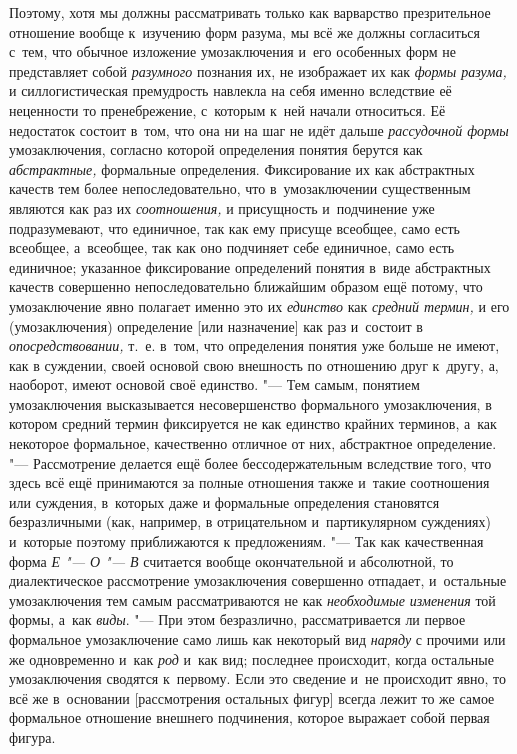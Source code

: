Поэтому, хотя мы должны рассматривать только как варварство
презрительное отношение вообще к~изучению форм разума, мы всё же должны
согласиться с~тем, что обычное изложение умозаключения и~его особенных форм
не представляет собой {\em разумного}
познания их, не изображает их как
{\em формы разума,} и
силлогистическая премудрость навлекла на себя именно вследствие её
неценности то пренебрежение, с~которым к~ней начали относиться. Её
недостаток состоит в~том, что она ни на шаг не идёт дальше
{\em рассудочной формы}
умозаключения, согласно которой определения понятия берутся
как {\em абстрактные,}
формальные определения. Фиксирование их как абстрактных
качеств тем более непоследовательно, что в~умозаключении существенным
являются как раз их {\em соотношения,}
и присущность и~подчинение уже подразумевают, что единичное,
так как ему присуще всеобщее, само есть всеобщее, а~всеобщее, так как оно
подчиняет себе единичное, само есть единичное; указанное фиксирование
определений понятия в~виде абстрактных качеств совершенно непоследовательно
ближайшим образом ещё потому, что умозаключение явно полагает именно это их
{\em единство} как
{\em средний термин,} и
его (умозаключения) определение [или назначение] как раз и~состоит в
{\em опосредствовании,}
т.~е. в~том, что определения понятия уже больше не имеют, как
в суждении, своей основой свою внешность по отношению друг к~другу, а,
наоборот, имеют основой своё единство. "--- Тем самым, понятием
умозаключения высказывается несовершенство формального умозаключения, в
котором средний термин фиксируется не как единство крайних терминов, а~как
некоторое формальное, качественно отличное от них, абстрактное
определение. "--- Рассмотрение делается ещё более
бессодержательным вследствие того, что здесь всё ещё принимаются за полные
отношения также и~такие соотношения или суждения, в~которых даже и
формальные определения становятся безразличными (как, например, в
отрицательном и~партикулярном суждениях) и~которые поэтому приближаются к
предложениям. "--- Так как качественная форма
{\em Е "--- О "--- В} считается вообще окончательной и
абсолютной, то диалектическое рассмотрение умозаключения совершенно
отпадает, и~остальные умозаключения тем самым рассматриваются не как
{\em необходимые изменения}
той формы, а~как
{\em виды}. "--- При этом
безразлично, рассматривается ли первое формальное умозаключение само лишь
как некоторый вид {\em наряду}
с прочими или же одновременно и~как
{\em род} и~как вид;
последнее происходит, когда остальные умозаключения сводятся к~первому.
Если это сведение и~не происходит явно, то всё же в~основании [рассмотрения
остальных фигур] всегда лежит то же самое формальное отношение внешнего
подчинения, которое выражает собой первая фигура.

